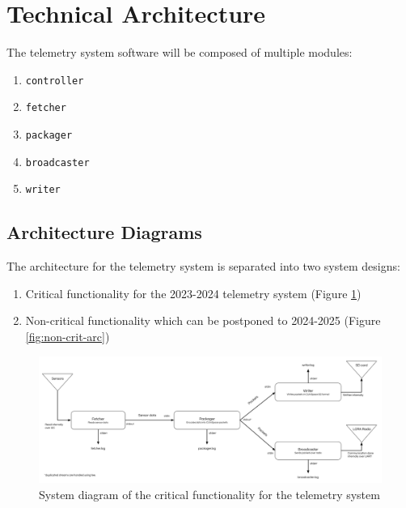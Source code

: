 \section{Technical Architecture}

The  telemetry system software will be composed of multiple modules:

\begin{enumerate}
    \setlength{\itemsep}{1pt}
    \setlength{\parskip}{0pt} \setlength{\parsep}{0pt}
    \item \texttt{controller}
    \item \texttt{fetcher}
    \item \texttt{packager}
    \item \texttt{broadcaster}
    \item \texttt{writer}
\end{enumerate}

\subsection{Architecture Diagrams}

The architecture for the  telemetry system is separated into two system designs:
\begin{enumerate}
    \setlength{\itemsep}{1pt}
    \setlength{\parskip}{0pt} \setlength{\parsep}{0pt}
    \item Critical functionality for the 2023-2024 telemetry system (Figure \ref{fig:crit-arc})
    \item Non-critical functionality which can be postponed to 2024-2025 (Figure \ref{fig:non-crit-arc})
\end{enumerate}

\begin{figure}[H]
    \includegraphics[width=\linewidth]{assets/critical-architecture.png}
    \caption{System diagram of the critical functionality for the telemetry system}
    \label{fig:crit-arc}
\end{figure}

